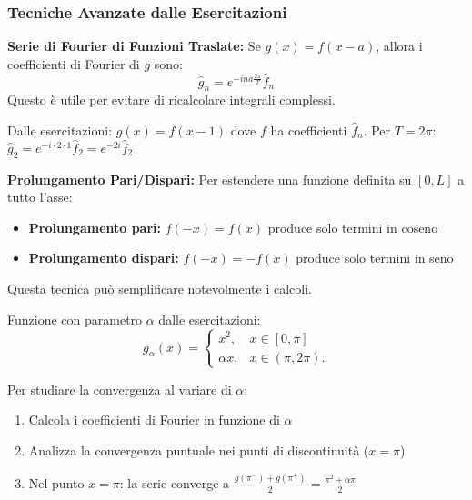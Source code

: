 \subsubsection{Tecniche Avanzate dalle Esercitazioni}

\begin{info}
\textbf{Serie di Fourier di Funzioni Traslate:}
Se $g(x) = f(x-a)$, allora i coefficienti di Fourier di $g$ sono:
\[ \hat{g}_n = e^{-ina\frac{2\pi}{T}} \hat{f}_n \]
Questo è utile per evitare di ricalcolare integrali complessi.
\end{info}

\begin{esempio}
Dalle esercitazioni: $g(x) = f(x-1)$ dove $f$ ha coefficienti $\hat{f}_n$.
Per $T = 2\pi$: $\hat{g}_2 = e^{-i \cdot 2 \cdot 1} \hat{f}_2 = e^{-2i} \hat{f}_2$
\end{esempio}

\begin{info}
\textbf{Prolungamento Pari/Dispari:}
Per estendere una funzione definita su $[0,L]$ a tutto l'asse:
\begin{itemize}
    \item \textbf{Prolungamento pari:} $f(-x) = f(x)$ produce solo termini in coseno
    \item \textbf{Prolungamento dispari:} $f(-x) = -f(x)$ produce solo termini in seno
\end{itemize}
Questa tecnica può semplificare notevolmente i calcoli.
\end{info}

\begin{esempio}
Funzione con parametro $\alpha$ dalle esercitazioni: 
\[ g_{\alpha}(x)=\begin{cases}x^{2},&x\in[0,\pi]\\ \alpha x,&x\in(\pi,2\pi).\end{cases} \]

Per studiare la convergenza al variare di $\alpha$:
\begin{enumerate}
    \item Calcola i coefficienti di Fourier in funzione di $\alpha$
    \item Analizza la convergenza puntuale nei punti di discontinuità ($x = \pi$)
    \item Nel punto $x = \pi$: la serie converge a $\frac{g(\pi^-) + g(\pi^+)}{2} = \frac{\pi^2 + \alpha\pi}{2}$
\end{enumerate}
\end{esempio}


